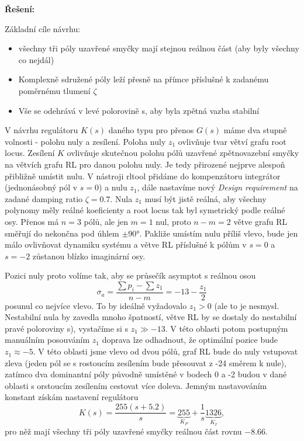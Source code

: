\documentclass[twoside]{article}
\begin{document}
\textbf{Řešení:}

Základní cíle návrhu:
\begin{itemize}
	\item všechny tři póly uzavřené smyčky mají stejnou reálnou část (aby byly všechny co nejdál)
	\item Komplexně sdružené póly leží přesně na přímce příslušné k zadanému poměrnému tlumení $\zeta$
	\item Vše se odehrává v levé polorovině s, aby byla zpětná vazba stabilní
\end{itemize}

V návrhu regulátoru $K(s)$ daného typu pro přenos $G(s)$ máme dva stupně volnosti - polohu nuly a zesílení. Poloha nuly $z_1$ ovlivňuje tvar větví grafu root locus.
Zesílení $K$ ovlivňuje skutečnou polohu pólů uzavřené zpětnovazební smyčky na větvích grafu RL pro danou polohu nuly. Je tedy přirozené nejprve alespoň přibližně umístit nulu.
V nástroji rltool přidáme do kompenzátoru integrátor (jednonásobný pól v $s= 0$) a nulu $z_1$, dále nastavíme nový \textit{Design requirement} na 
zadané damping ratio $\zeta = 0.7$. Nula $z_1$ musí být jistě reálná, aby všechny polynomy měly reálné koeficienty a root locus tak byl symetrický podle reálné osy.
Přenos má $n = 3$ pólů, ale jen $m = 1$ nul, proto $n-m = 2$ větve grafu RL směřují do nekončna pod úhlem $\pm 90$°. Pakliže umístím nulu příliš vlevo,
bude jen málo ovlivňovat dynamiku systému a větve RL příslušné k pólům v $s = 0$ a $s = -2$ zůstanou blízko imaginární osy.

Pozici nuly proto volíme tak, aby se průsečík asymptot s reálnou osou
\begin{equation}
	\sigma_a = \frac{\sum p_i - \sum z_1}{n - m} = -13 -\frac{z_1}{2}
\end{equation}
posunul co nejvíce vlevo. To by ideálně vyžadovalo $z_1 > 0$ (ale to je nesmysl. Nestabilní nula by zavedla mnoho špatností, větve RL by se dostaly do nestabilní pravé poloroviny s),
vystačíme si s $z_1 \gg -13$. V této oblasti potom postupným manuálním posouváním $z_1$ doprava lze odhadnout, že optimální pozice bude $z_1 \approx -5$.
V této oblasti jsme vlevo od dvou pólů, graf RL bude do nuly vstupovat zleva (jeden pól se s rostoucím zesílením bude přesouvat z -24 směrem k nule),
zatímco dva dominantní póly původně umístěné v bodech 0 a -2 budou v dané oblasti s orstoucím zesílením cestovat více doleva.
Jemným nastavováním konstant získám nastavení regulátoru
\begin{equation}
	K(s) = \frac{255(s+5.2)}{s} = \underbrace{255}_{K_P} + \frac{1}{s} \underbrace{1326}_{K_I},
\end{equation}
pro něž mají všechny tři póly uzavřené smyčky reálnou část rovnu $-8.66$.
\end{document}
